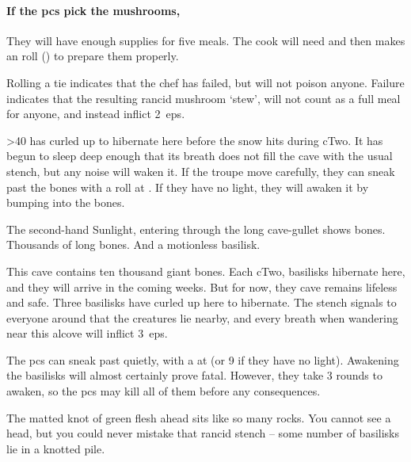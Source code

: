 \begin{multicols}{2}
\paragraph{If the \glspl{pc} pick the mushrooms,}
They will have enough supplies for five meals.
The cook will need  and then makes an  roll (\tn[10]) to prepare them properly.

Rolling a tie indicates that the chef has failed, but will not poison anyone.
Failure indicates that the resulting rancid mushroom `stew', will not count as a full meal for anyone, and instead inflict 2~\glspl{ep}.


\metroMapDistances[t]


\ifcase\thecycle%
  \ifnum\thefenestraDay>40%
     has curled up to hibernate here before the snow hits during \gls{cTwo}.
    It has begun to sleep deep enough that its breath does not fill the cave with the usual stench, but any noise will waken it.
    If the troupe move carefully, they can sneak past the bones with a  roll at \tn[9].
    If they have no light, they will awaken it by bumping into the bones.

    \begin{boxtext}
      The second-hand Sunlight, entering through the long cave-gullet shows bones.
      Thousands of long bones.
      And a motionless \gls{basilisk}.
    \end{boxtext}

    \basilisk
  \else%
    This cave contains ten thousand giant bones.
    Each \gls{cTwo}, \glspl{basilisk} hibernate here, and they will arrive in the coming weeks.
    But for now, they cave remains lifeless and safe.
  \fi%
\or
  Three \glspl{basilisk} have curled up here to hibernate.
  The stench signals to everyone around that the creatures lie nearby, and every breath when wandering near this alcove will inflict 3~\glspl{ep}.

  The \glspl{pc} can sneak past quietly, with a  at \tn[6] (or 9 if they have no light).
  Awakening the \glspl{basilisk} will almost certainly prove fatal.
  However, they take 3 rounds to awaken, so the \glspl{pc} may kill all of them before any consequences.

  \begin{boxtext}
    The matted knot of green flesh ahead sits like so many rocks.
    You cannot see a head, but you could never mistake that rancid stench -- some number of \glspl{basilisk} lie in a knotted pile.
  \end{boxtext}


\end{multicols}
